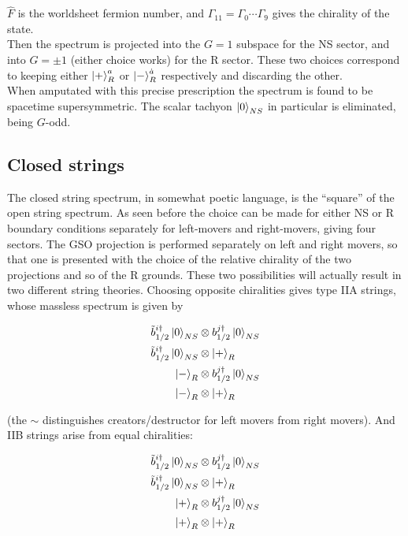 $\hat F$ is the worldsheet fermion number, and $\Gamma_{11} = \Gamma_0 \cdots\Gamma_9$ gives the chirality of the state.\\

Then the spectrum is projected into the $G=1$ subspace for the NS sector, and into $G=\pm1$ (either choice works) for the R sector. These two choices correspond to keeping either $\ket{+}^a_R$ or $\ket{-}^{\dot a}_R$ respectively and discarding the other.\\

When amputated with this precise prescription the spectrum is found to be spacetime supersymmetric. The scalar tachyon $\ket{0}_{NS}$ in particular is eliminated, being $G$-odd.


\subsection{Closed strings}

The closed string spectrum, in somewhat poetic language, is the ``square'' of the open string spectrum. As seen before the choice can be made for either NS or R boundary conditions separately for left-movers and right-movers, giving four sectors. The GSO projection is performed separately on left and right movers, so that one is presented with the choice of the relative chirality of the two projections and so of the R grounds. These two possibilities will actually result in two different string theories. Choosing opposite chiralities gives type IIA strings, whose massless spectrum is given by

\begin{align}
	\tilde b_{1/2}^{i\dagger} \ket 0_{NS} &\otimes b_{1/2}^{j\dagger}\ket{0}_{NS} \\
	\tilde b_{1/2}^{i\dagger} \ket 0_{NS} &\otimes \ket{+}_{R}\\
	\ket{-}_R &\otimes b_{1/2}^{j\dagger}\ket{0}_{NS}\\
	\ket{-}_R &\otimes \ket{+}_R
	\label{}
\end{align}

(the $\sim$ distinguishes creators/destructor for left movers from right movers). And IIB strings arise from equal chiralities:


\begin{align}
	\tilde b_{1/2}^{i\dagger} \ket 0_{NS} &\otimes b_{1/2}^{j\dagger}\ket{0}_{NS} \label{NSNSground}\\
	\tilde b_{1/2}^{i\dagger} \ket 0_{NS} &\otimes \ket{+}_{R}\\
	\ket{+}_R &\otimes b_{1/2}^{j\dagger}\ket{0}_{NS}\\
	\ket{+}_R &\otimes \ket{+}_R
	\label{}
\end{align}

